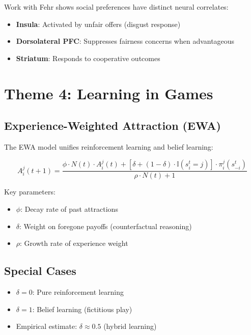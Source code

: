 Work with Fehr \citep{fehr2007neurobiology} shows social preferences have distinct neural correlates:
\begin{itemize}[nosep]
\item \textbf{Insula}: Activated by unfair offers (disgust response)
\item \textbf{Dorsolateral PFC}: Suppresses fairness concerns when advantageous
\item \textbf{Striatum}: Responds to cooperative outcomes
\end{itemize}


\section{Theme 4: Learning in Games}
\label{sec:ca-learning}

\subsection{Experience-Weighted Attraction (EWA)}

The EWA model \citep{PAP-camerer2005frame} unifies reinforcement learning and belief learning:

\begin{equation}
A_i^j(t+1) = \frac{\phi \cdot N(t) \cdot A_i^j(t) + [\delta + (1-\delta) \cdot \mathbb{I}(s_i^t = j)] \cdot \pi_i^j(s_{-i}^t)}{\rho \cdot N(t) + 1}
\end{equation}

Key parameters:
\begin{itemize}[nosep]
\item $\phi$: Decay rate of past attractions
\item $\delta$: Weight on foregone payoffs (counterfactual reasoning)
\item $\rho$: Growth rate of experience weight
\end{itemize}

\subsection{Special Cases}

\begin{itemize}[nosep]
\item $\delta = 0$: Pure reinforcement learning
\item $\delta = 1$: Belief learning (fictitious play)
\item Empirical estimate: $\delta \approx 0.5$ (hybrid learning)
\end{itemize}



